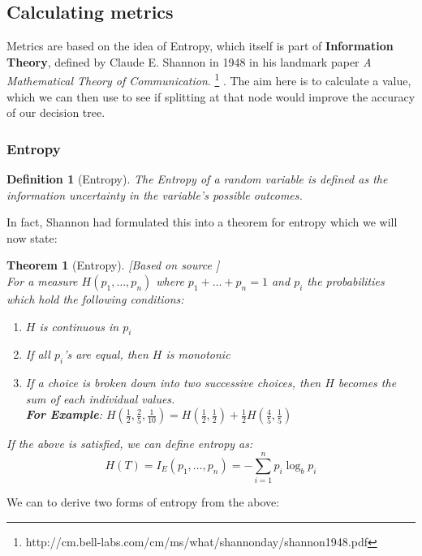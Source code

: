 \documentclass[11pt,a4paper]{report}
\newtheorem{theorem}{Theorem}
\newtheorem{definition}{Definition}
\begin{document}
\subsection{Calculating metrics}
Metrics are based on the idea of Entropy, which itself is part of \textbf{Information Theory}, defined by Claude E. Shannon in 1948 in his landmark paper \textit{A Mathematical Theory of Communication}. \footnote{http://cm.bell-labs.com/cm/ms/what/shannonday/shannon1948.pdf} \cite{Shannon}. 
The aim here is to calculate a value, which we can then use to see if splitting at that node would improve the accuracy of our decision tree.

\subsubsection{Entropy}
\begin{definition}[Entropy]\cite{Shannon}
The Entropy of a random variable is defined as the information uncertainty in the variable's possible outcomes.
\end{definition}
In fact, Shannon had formulated this into a theorem for entropy which we will now state:
\begin{theorem}[Entropy] [Based on source \cite[Section 6, p. 10]{Shannon}]\\
For a measure $H(p_1,\dots,p_n)$ where $p_1 + \dots + p_n = 1$ and $p_i$ the probabilities which hold the following conditions:
\begin{enumerate}
    \item $H$ is continuous in $p_i$
    
    \item If all $p_i$'s are equal, then $H$ is monotonic
    
    \item If a choice is broken down into two successive choices, then $H$ becomes the sum of each individual values.\\
    \textbf{For Example}: $H(\frac{1}{2}, \frac{2}{5}, \frac{1}{10}) = H(\frac{1}{2}, \frac{1}{2}) + \frac{1}{2}H(\frac{4}{5}, \frac{1}{5})$
\end{enumerate}
If the above is satisfied, we can define entropy as:
\begin{equation}
    H(T) = I_E (p_1, \dots , p_n) = -\sum_{i=1}^{n} p_i \log_b p_i
    \label{eq:entropy}
\end{equation}
\end{theorem}
We can to derive two forms of entropy from the above:
\end{document}
